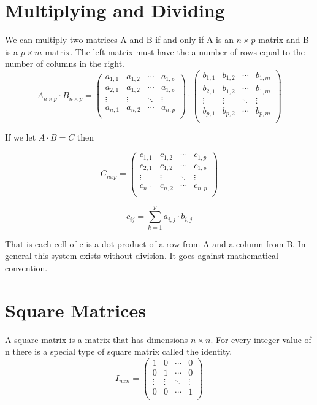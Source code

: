 \section{Multiplying and Dividing}
We can multiply two matrices A and B if and only if A is an $n \times p$ matrix and B is a $p \times m$ matrix. The left matrix must have the a number of rows equal to the number of columns in the right.
\begin{equation*}
    A_{n\times p} \cdot B_{n \times p} = 
    \begin{pmatrix}
    a_{1,1} & a_{1,2} & \cdots & a_{1,p} \\
    a_{2,1} & a_{1,2} & \cdots & a_{1,p} \\
    \vdots & \vdots & \ddots & \vdots \\
    a_{n,1} & a_{n,2} & \cdots & a_{n,p} \\
    \end{pmatrix} \cdot
    \begin{pmatrix}
    b_{1,1} & b_{1,2} & \cdots & b_{1,m} \\
    b_{2,1} & b_{1,2} & \cdots & b_{1,m} \\
    \vdots & \vdots & \ddots & \vdots \\
    b_{p,1} & b_{p,2} & \cdots & b_{p,m} \\
    \end{pmatrix}
\end{equation*}

If we let $A \cdot B = C$ then 

\begin{equation*}
C_{nxp} = 
    \begin{pmatrix}
    c_{1,1} & c_{1,2} & \cdots & c_{1,p} \\
    c_{2,1} & c_{1,2} & \cdots & c_{1,p} \\
    \vdots & \vdots & \ddots & \vdots \\
    c_{n,1} & c_{n,2} & \cdots & c_{n,p} \\
    \end{pmatrix}
\end{equation*}

\[c_{ij}=\sum_{k=1}^{p}a_{i,j}\cdot b_{i,j}\]

That is each cell of c is a dot product of a row from A and a column from B.
In general this system exists without division. It goes against mathematical convention.

\section{Square Matrices}
A square matrix is a matrix that has dimensions $n \times n$. For every integer value of n there is a special type of square matrix called the identity.
\begin{equation*}
I_{nxn} = 
    \begin{pmatrix}
    1 & 0 & \cdots & 0 \\
    0 & 1 & \cdots & 0 \\
    \vdots & \vdots & \ddots & \vdots \\
    0 & 0 & \cdots & 1 \\
    \end{pmatrix}
\end{equation*}


